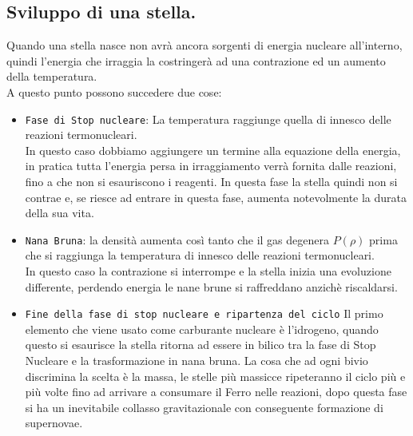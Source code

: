 \subsection{Sviluppo di una stella.}
\label{subsec:Sviluppo di una stella.}
Quando una stella nasce non avrà ancora sorgenti di energia nucleare all'interno, quindi l'energia che irraggia la costringerà ad una contrazione ed un aumento della temperatura. \\
A questo punto possono succedere due cose:
\begin{itemize}
	\item \texttt{Fase di Stop nucleare}: La temperatura raggiunge quella di innesco delle reazioni termonucleari. \\
		In questo caso dobbiamo aggiungere un termine alla equazione della energia, in pratica tutta l'energia persa in irraggiamento verrà fornita dalle reazioni, fino a che non si esauriscono i reagenti. In questa fase la stella quindi non si contrae e, se riesce ad entrare in questa fase, aumenta notevolmente la durata della sua vita.
	\item \texttt{Nana Bruna}: la densità aumenta così tanto che il gas degenera $P(\rho )$ prima che si raggiunga la temperatura di innesco delle reazioni termonucleari.\\
		In questo caso la contrazione si interrompe e la stella inizia una evoluzione differente, perdendo energia le nane brune si raffreddano anzichè riscaldarsi.
	\item \texttt{Fine della fase di stop nucleare e ripartenza del ciclo} Il primo elemento che viene usato come carburante nucleare è l'idrogeno, quando questo si esaurisce la stella ritorna ad essere in bilico tra la fase di Stop Nucleare e la trasformazione in nana bruna. La cosa che ad ogni bivio discrimina la scelta è la massa, le stelle più massicce ripeteranno il ciclo più e più volte fino ad arrivare a consumare il Ferro nelle reazioni, dopo questa fase si ha un inevitabile collasso gravitazionale con conseguente formazione di supernovae.
\end{itemize}
